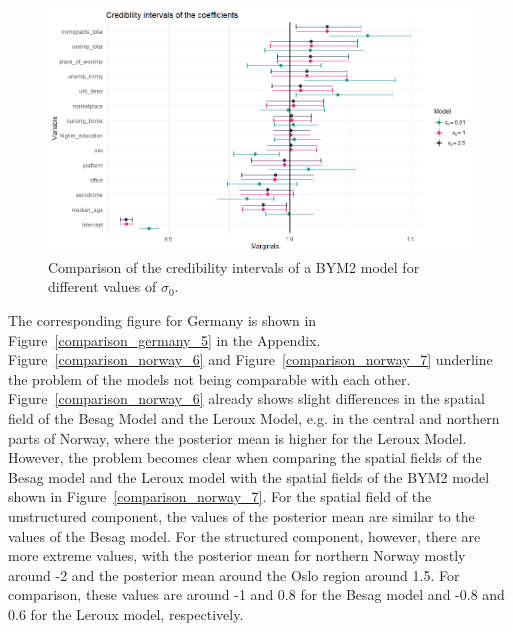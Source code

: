 \begin{figure}[H]
    \centering
    \includegraphics[width = \textwidth]{intervals_prior_norway.png}
    \caption{Comparison of the credibility intervals of a BYM2 model for different values of $\sigma_0$.}
    \label{comparison_norway_5}
\end{figure}
%     
The corresponding figure for Germany is shown in Figure~\ref{comparison_germany_5} in the Appendix. \\
Figure~\ref{comparison_norway_6} and Figure~\ref{comparison_norway_7} underline the problem of the models not being comparable with each other. Figure~\ref{comparison_norway_6} already shows slight differences in the spatial field of the Besag Model and the Leroux Model, e.g. in the central and northern parts of Norway, where the posterior mean is higher for the Leroux Model. However, the problem becomes clear when comparing the spatial fields of the Besag model and the Leroux model with the spatial fields of the BYM2 model shown in Figure~\ref{comparison_norway_7}. For the spatial field of the unstructured component, the values of the posterior mean are similar to the values of the Besag model. For the structured component, however, there are more extreme values, with the posterior mean for northern Norway mostly around -2 and the posterior mean around the Oslo region around 1.5. For comparison, these values are around -1 and 0.8 for the Besag model and -0.8 and 0.6 for the Leroux model, respectively.
